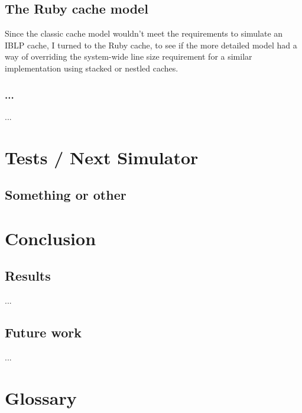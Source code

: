 \documentclass[12pt,twoside]{reedthesis}
\begin{document}
\section{The Ruby cache model}

	Since the classic cache model wouldn't meet the requirements to simulate an IBLP cache, I turned to the Ruby cache, to see if the more detailed model had a way of overriding the system-wide line size requirement for a similar implementation using stacked or nestled caches.

	\subsection*{...}
	...


\chapter{Tests / Next Simulator}

\section{Something or other}

\chapter*{Conclusion}

\section{Results}

...

\section{Future work}

...

\appendix
\chapter{Glossary}
\end{document}
